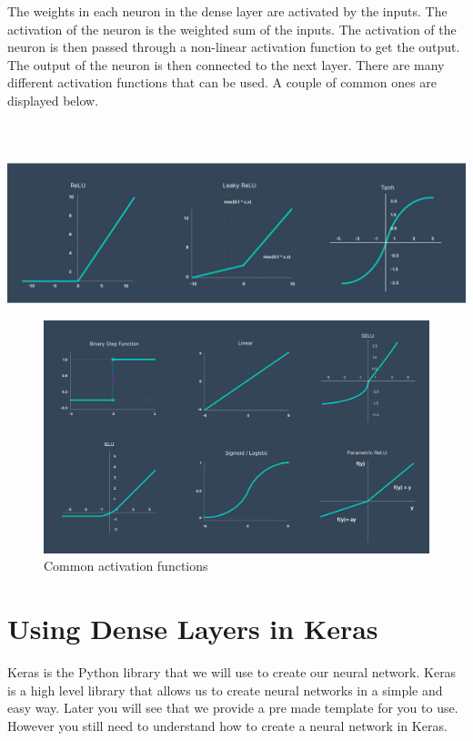 \documentclass[11pt]{report}
\begin{document}
The weights in each neuron in the dense layer are activated by the inputs. The activation of the neuron is the weighted sum of the inputs. The activation of the neuron is then passed through a non-linear activation function to get the output. The output of the neuron is then connected to the next layer. There are many different activation functions that can be used. A couple of common ones are displayed below.
\\ \\ \\ \\
\includegraphics[width=1\textwidth]{activation functions 1.jpg}
\begin{figure}
    \begin{center}
    \includegraphics[width=1\textwidth]{activation functions 2.jpg}
    \caption{Common activation functions}
    \label{fig:activation_functions}
    \end{center}
\end{figure}

\pagebreak 

\section{Using Dense Layers in Keras}
Keras is the Python library that we will use to create our neural network. Keras is a high level library that allows us to create neural networks in a simple and easy way. Later you will see that we provide a pre made template for you to use. However you still need to understand how to create a neural network in Keras.
\end{document}

